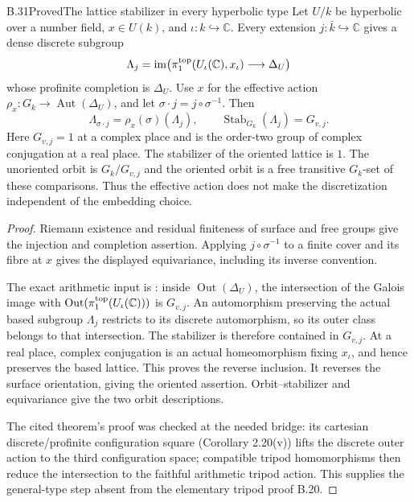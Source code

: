 \begin{statement}{B.31}{Proved}{The lattice stabilizer in every hyperbolic type}
Let $U/k$ be hyperbolic over a number field, $x\in U(k)$, and
$\iota:k\hookrightarrow\mathbb C$.  Every extension
$j:\bar k\hookrightarrow\mathbb C$ gives a dense discrete subgroup
\[
 \Lambda_j=\operatorname{im}\bigl(
 \pi_1^{\rm top}(U_\iota(\mathbb C),x_\iota)
       \longrightarrow\Delta_U\bigr)
\]
whose profinite completion is $\Delta_U$.
Use $x$ for the effective action $\rho_x:G_k\to\operatorname{Aut}(\Delta_U)$,
and let $\sigma\cdot j=j\circ\sigma^{-1}$.  Then
\[
 \Lambda_{\sigma\cdot j}=\rho_x(\sigma)(\Lambda_j),\qquad
 \operatorname{Stab}_{G_k}(\Lambda_j)=G_{v,j}.
\]
Here $G_{v,j}=1$ at a complex place and is the order-two group of
complex conjugation at a real place.  The stabilizer of the oriented
lattice is $1$.  The unoriented orbit is $G_k/G_{v,j}$ and the
oriented orbit is a free transitive $G_k$-set of these comparisons.
Thus the effective action does not make the discretization
independent of the embedding choice.
\end{statement}
\begin{proof}
Riemann existence and residual finiteness of surface and free
groups give the injection and completion assertion.  Applying
$j\circ\sigma^{-1}$ to a finite cover and its fibre at $x$ gives
the displayed equivariance, including its inverse convention.

The exact arithmetic input is
\cite[Corollary 2.25]{B_HoshiMochizukiIV}:
inside $\operatorname{Out}(\Delta_U)$, the intersection of the
Galois image with
$\operatorname{Out}(\pi_1^{\rm top}(U_\iota(\mathbb C)))$ is $G_{v,j}$.
An automorphism preserving the actual based subgroup $\Lambda_j$
restricts to its discrete automorphism, so its outer class belongs
to that intersection.  The stabilizer is therefore contained in
$G_{v,j}$.  At a real place, complex conjugation is an actual
homeomorphism fixing $x_\iota$, and hence preserves the based lattice.
This proves the reverse inclusion.  It reverses the surface
orientation, giving the oriented assertion.  Orbit--stabilizer
and equivariance give the two orbit descriptions.

The cited theorem's proof was checked at the needed bridge:
its cartesian discrete/profinite configuration square
(Corollary 2.20(v)) lifts the discrete outer action to the third
configuration space; compatible tripod homomorphisms then reduce
the intersection to the faithful arithmetic tripod action.
This supplies the general-type step absent from the elementary
tripod proof B.20.
\end{proof}

